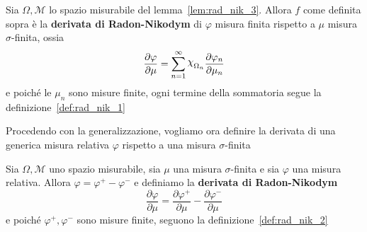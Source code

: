 \begin{definition}
\label{def:rad_nik_2}
    Sia \(\Omega, \mathcal{M}\) lo spazio misurabile del
    lemma~\ref{lem:rad_nik_3}. Allora \(f\) come definita sopra è la
    \textbf{derivata di Radon-Nikodym} di \(\varphi \) misura finita rispetto a
    \(\mu\) misura \(\sigma\)-finita, ossia
    \[
        \frac{\partial \varphi }{\partial \mu} = \sum_{n=1}^{\infty}
        \rchi_{\Omega_n} \frac{\partial \varphi_n}{\partial \mu_n}
    \]
    e poiché le \(\mu_n\) sono misure finite, ogni termine della sommatoria
    segue la definizione~\ref{def:rad_nik_1}

\end{definition}

Procedendo con la generalizzazione, vogliamo ora definire la derivata di una
generica misura relativa \(\varphi \) rispetto a una misura \(\sigma\)-finita

\begin{definition}
\label{def:rad_nik}
    Sia \(\Omega, \mathcal{M}\) uno spazio misurabile, sia \(\mu\) una misura
    \(\sigma\)-finita e sia \(\varphi \) una misura relativa. Allora \(\varphi =
    \varphi^{+} - \varphi^{-}\) e definiamo la \textbf{derivata di Radon-Nikodym}
    \[
        \frac{\partial \varphi }{\partial \mu} = \frac{\partial \varphi^{+}}{\partial \mu} - \frac{\partial \varphi^{-}}{\partial \mu}
    \]
    e poiché \(\varphi^{+}, \varphi^{-}\) sono misure finite, seguono
    la definizione~\ref{def:rad_nik_2}
\end{definition}

